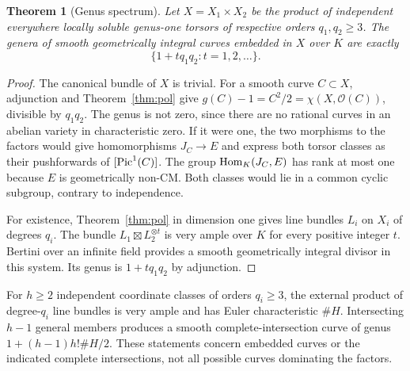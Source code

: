 \documentclass[11pt,a4paper]{article}
\newtheorem{theorem}{Theorem}[section]
\theoremstyle{definition}\newtheorem{definition}[theorem]{Definition}
\theoremstyle{remark}\newtheorem{remark}[theorem]{Remark}
\numberwithin{equation}{section}
\begin{document}
\begin{theorem}[Genus spectrum]\label{thm:genus}
Let $X=X_1\times X_2$ be the product of independent everywhere locally soluble genus-one torsors of respective orders $q_1,q_2\geq3$. The genera of smooth geometrically integral curves embedded in $X$ over $K$ are exactly
\[
\{1+tq_1q_2:t=1,2,\ldots\}.
\]
\end{theorem}
\begin{proof}
The canonical bundle of $X$ is trivial. For a smooth curve $C\subset X$, adjunction and Theorem~\ref{thm:pol} give $g(C)-1=C^2/2=\chi(X,\mathcal O(C))$, divisible by $q_1q_2$. The genus is not zero, since there are no rational curves in an abelian variety in characteristic zero. If it were one, the two morphisms to the factors would give homomorphisms $J_C\to E$ and express both torsor classes as their pushforwards of $[\operatorname{Pic}^1(C)]$. The group $\operatorname{Hom}_K(J_C,E)$ has rank at most one because $E$ is geometrically non-CM. Both classes would lie in a common cyclic subgroup, contrary to independence.

For existence, Theorem~\ref{thm:pol} in dimension one gives line bundles $L_i$ on $X_i$ of degrees $q_i$. The bundle $L_1\boxtimes L_2^{\otimes t}$ is very ample over $K$ for every positive integer $t$. Bertini over an infinite field provides a smooth geometrically integral divisor in this system. Its genus is $1+tq_1q_2$ by adjunction.
\end{proof}
For $h\geq2$ independent coordinate classes of orders $q_i\geq3$, the external product of degree-$q_i$ line bundles is very ample and has Euler characteristic $\#H$. Intersecting $h-1$ general members produces a smooth complete-intersection curve of genus $1+(h-1)h!\#H/2$. These statements concern embedded curves or the indicated complete intersections, not all possible curves dominating the factors.
\end{document}
